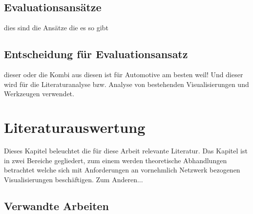 \documentclass[draft=false
              ,paper=a4
              ,twoside=false
              ,fontsize=11pt
              ,headsepline
              ,BCOR10mm
              ,DIV11
              ]{scrbook}
\newcommand{\TODO}[1]{\colorbox{yellow}{\textcolor{red}{[TODO: #1]}}}
\begin{document}

\section{Evaluationsansätze} %
\label{sec:evaluationsansätze}
dies sind die Ansätze die es so gibt

\section{Entscheidung für Evaluationsansatz} %
\label{sec:entscheidung_für_evaluationsansatz}
dieser oder die Kombi aus diesen ist für Automotive am besten weil! Und dieser wird für die Literaturanalyse bzw. Analyse von bestehenden Visualisierungen und Werkzeugen verwendet.


\chapter{Literaturauswertung} %
\label{cha:literaturauswertung}

Dieses Kapitel beleuchtet die für diese Arbeit relevante Literatur. Das Kapitel ist in zwei Bereiche gegliedert, zum einem werden theoretische Abhandlungen betrachtet welche sich mit Anforderungen an vornehmlich Netzwerk bezogenen Visualisierungen beschäftigen. Zum Anderen...

\section{Verwandte Arbeiten} %
\label{sec:verwandte_arbeiten}

\end{document}
